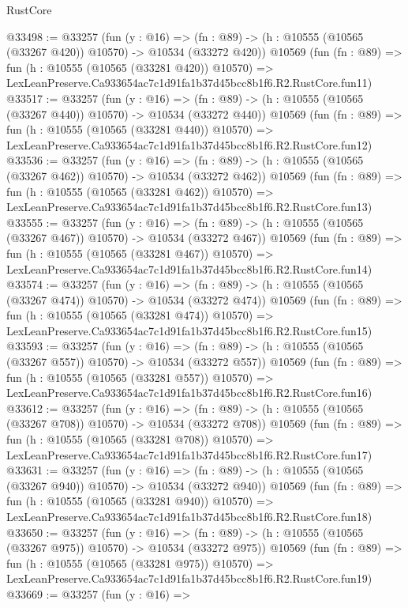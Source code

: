 \begin{lexlean}{RustCore}
\begin{coremodule}
@33498 := @33257
    (fun (y : @16) =>
    (fn : @89) -> (h : @10555 (@10565 (@33267 @420)) @10570) -> @10534 (@33272 @420))
    @10569
    (fun (fn : @89) =>
    fun (h : @10555 (@10565 (@33281 @420)) @10570) =>
    LexLeanPreserve.Ca933654ac7c1d91fa1b37d45bcc8b1f6.R2.RustCore.fun11)
@33517 := @33257
    (fun (y : @16) =>
    (fn : @89) -> (h : @10555 (@10565 (@33267 @440)) @10570) -> @10534 (@33272 @440))
    @10569
    (fun (fn : @89) =>
    fun (h : @10555 (@10565 (@33281 @440)) @10570) =>
    LexLeanPreserve.Ca933654ac7c1d91fa1b37d45bcc8b1f6.R2.RustCore.fun12)
@33536 := @33257
    (fun (y : @16) =>
    (fn : @89) -> (h : @10555 (@10565 (@33267 @462)) @10570) -> @10534 (@33272 @462))
    @10569
    (fun (fn : @89) =>
    fun (h : @10555 (@10565 (@33281 @462)) @10570) =>
    LexLeanPreserve.Ca933654ac7c1d91fa1b37d45bcc8b1f6.R2.RustCore.fun13)
@33555 := @33257
    (fun (y : @16) =>
    (fn : @89) -> (h : @10555 (@10565 (@33267 @467)) @10570) -> @10534 (@33272 @467))
    @10569
    (fun (fn : @89) =>
    fun (h : @10555 (@10565 (@33281 @467)) @10570) =>
    LexLeanPreserve.Ca933654ac7c1d91fa1b37d45bcc8b1f6.R2.RustCore.fun14)
@33574 := @33257
    (fun (y : @16) =>
    (fn : @89) -> (h : @10555 (@10565 (@33267 @474)) @10570) -> @10534 (@33272 @474))
    @10569
    (fun (fn : @89) =>
    fun (h : @10555 (@10565 (@33281 @474)) @10570) =>
    LexLeanPreserve.Ca933654ac7c1d91fa1b37d45bcc8b1f6.R2.RustCore.fun15)
@33593 := @33257
    (fun (y : @16) =>
    (fn : @89) -> (h : @10555 (@10565 (@33267 @557)) @10570) -> @10534 (@33272 @557))
    @10569
    (fun (fn : @89) =>
    fun (h : @10555 (@10565 (@33281 @557)) @10570) =>
    LexLeanPreserve.Ca933654ac7c1d91fa1b37d45bcc8b1f6.R2.RustCore.fun16)
@33612 := @33257
    (fun (y : @16) =>
    (fn : @89) -> (h : @10555 (@10565 (@33267 @708)) @10570) -> @10534 (@33272 @708))
    @10569
    (fun (fn : @89) =>
    fun (h : @10555 (@10565 (@33281 @708)) @10570) =>
    LexLeanPreserve.Ca933654ac7c1d91fa1b37d45bcc8b1f6.R2.RustCore.fun17)
@33631 := @33257
    (fun (y : @16) =>
    (fn : @89) -> (h : @10555 (@10565 (@33267 @940)) @10570) -> @10534 (@33272 @940))
    @10569
    (fun (fn : @89) =>
    fun (h : @10555 (@10565 (@33281 @940)) @10570) =>
    LexLeanPreserve.Ca933654ac7c1d91fa1b37d45bcc8b1f6.R2.RustCore.fun18)
@33650 := @33257
    (fun (y : @16) =>
    (fn : @89) -> (h : @10555 (@10565 (@33267 @975)) @10570) -> @10534 (@33272 @975))
    @10569
    (fun (fn : @89) =>
    fun (h : @10555 (@10565 (@33281 @975)) @10570) =>
    LexLeanPreserve.Ca933654ac7c1d91fa1b37d45bcc8b1f6.R2.RustCore.fun19)
@33669 := @33257
    (fun (y : @16) =>

\end{coremodule}
\end{lexlean}
